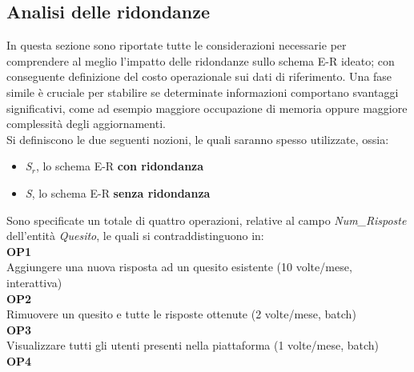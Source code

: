\documentclass{article}
\begin{document}
\subsection{Analisi delle ridondanze}
\large
In questa sezione sono riportate tutte le considerazioni necessarie per comprendere al meglio l'impatto delle ridondanze sullo schema E-R ideato; con conseguente definizione del costo operazionale sui dati di riferimento. Una fase simile è cruciale per stabilire se determinate informazioni comportano svantaggi significativi, come ad esempio maggiore occupazione di memoria oppure maggiore complessità degli aggiornamenti.\vspace{7pt}\\
Si definiscono le due seguenti nozioni, le quali saranno spesso utilizzate, ossia:
\begin{itemize}[label={ }]
    \itemsep0em
    \item \textit{S$_r$}, lo schema E-R \textbf{con ridondanza}
    \item \textit{S}, \hspace{1px} lo schema E-R \textbf{senza ridondanza}
\end{itemize}
\vspace*{7pt}
Sono specificate un totale di quattro operazioni, relative al campo \textit{Num\_Risposte} dell'entità \textit{Quesito}, le quali si contraddistinguono in: \vspace*{7pt}\\
\hspace*{5pt}\textbf{OP1} \\
\hspace*{5pt}Aggiungere una nuova risposta ad un quesito esistente (10 volte/mese, interattiva) \vspace*{7pt}\\
\hspace*{5pt}\textbf{OP2} \\
\hspace*{5pt}Rimuovere un quesito e tutte le risposte ottenute (2 volte/mese, batch) \vspace*{7pt}\\
\hspace*{5pt}\textbf{OP3} \\
\hspace*{5pt}Visualizzare tutti gli utenti presenti nella piattaforma (1 volte/mese, batch) \vspace*{7pt}\\
\hspace*{5pt}\textbf{OP4} \\
\end{document}
